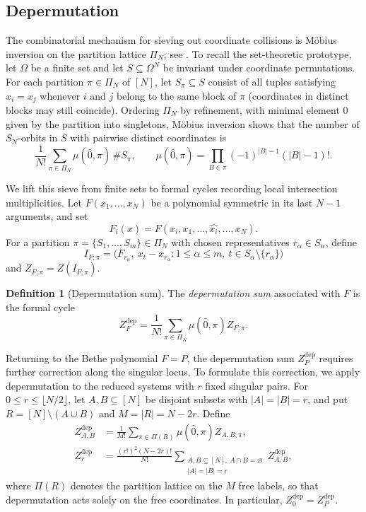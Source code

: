 \documentclass[11pt]{article}
\theoremstyle{definition}
\newtheorem{definition}[proposition]{Definition}
\begin{document}
\subsection{Depermutation}
\label{sec:depermutation}

The combinatorial mechanism for sieving out coordinate collisions is M\"obius inversion on the
partition lattice $\Pi_N$; see \cite[Section~3.7]{Stanley2012}. To recall the set-theoretic prototype, let $\Omega$ be a finite set and let
$S\subseteq\Omega^N$ be invariant under coordinate permutations. For each
partition $\pi\in\Pi_N$ of $[N]$, let $S_\pi\subseteq S$ consist of all tuples satisfying
$x_i=x_j$ whenever $i$ and $j$ belong to the same block of $\pi$ (coordinates in
distinct blocks may still coincide). Ordering $\Pi_N$
by refinement, with minimal element $\hat{0}$ given by the partition into singletons, M\"obius inversion shows that
the number of $S_N$-orbits in $S$ with pairwise distinct
coordinates is
\[
\frac{1}{N!}\sum_{\pi\in\Pi_N}\mu(\hat{0},\pi)\,\#S_\pi,
\qquad
\mu(\hat{0},\pi)=\prod_{B\in\pi}(-1)^{|B|-1}(|B|-1)!.
\]

We lift this sieve from finite sets to formal cycles recording local intersection multiplicities.
Let $F(x_1,\ldots,x_N)$ be a polynomial symmetric in
its last $N-1$ arguments, and set
\[
F_i(x)=F(x_i,x_1,\ldots,\widehat{x_i},\ldots,x_N).
\]
For a partition $\pi=\{S_1,\ldots,S_m\}\in\Pi_N$ with chosen representatives
$r_\alpha\in S_\alpha$, define
\[
I_{F;\pi}=\bigl(F_{r_\alpha},\ x_t-x_{r_\alpha} :
1\le \alpha\le m,\ t\in S_\alpha\setminus\{r_\alpha\}\bigr)
\]
and $Z_{F;\pi}=Z(I_{F;\pi})$.

\begin{definition}[Depermutation sum]
	\label{def:depermutation}
	The \emph{depermutation sum} associated with $F$ is the formal cycle
	\begin{equation}\label{eq:cycle}
		Z^{\mathrm{dep}}_F=\frac{1}{N!}
		\sum_{\pi\in\Pi_N}
		\mu(\hat{0},\pi)Z_{F;\pi}.
	\end{equation}
\end{definition}

Returning to the Bethe polynomial $F=P$, the depermutation sum $Z^{\mathrm{dep}}_P$ requires further correction along the singular locus.
To formulate this correction, we apply depermutation to the reduced systems
with $r$ fixed singular pairs. For $0\le r\le\lfloor N/2\rfloor$,
let $A,B\subseteq[N]$ be disjoint subsets with $|A|=|B|=r$, and put
$R=[N]\setminus(A\cup B)$ and $M=|R|=N-2r$. Define
\begin{equation}\label{eq:reduced-fixed-pair-depermutation}
	\begin{aligned}
		Z^{\mathrm{dep}}_{A,B}
		&=\frac{1}{M!}\sum_{\pi\in\Pi(R)}
		\mu(\hat{0},\pi)Z_{A,B;\pi},\\
		Z^{\mathrm{dep}}_r
		&=
		\frac{(r!)^2(N-2r)!}{N!}\sum_{\substack{A,B\subseteq[N],\ A\cap B=\varnothing\\
				|A|=|B|=r}}Z^{\mathrm{dep}}_{A,B},
	\end{aligned}
\end{equation}
where $\Pi(R)$ denotes the partition lattice on the $M$ free labels, so that depermutation acts solely on the free coordinates. In particular, $Z^{\mathrm{dep}}_0=Z^{\mathrm{dep}}_P$.
\end{document}
